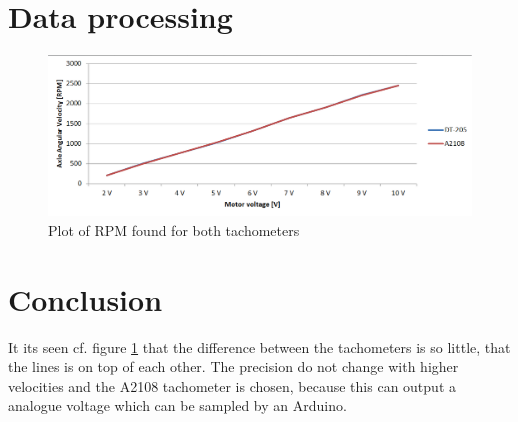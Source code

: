 \section*{Data processing}

\begin{figure}[htbp]
	\centering
	\includegraphics[width=\textwidth]{figures/appendix/Motor&GearTests/RPMTest}
	\caption{Plot of RPM found for both tachometers}\label{fig:RPMTest}
\end{figure}

\section*{Conclusion}
It its seen cf. figure \ref{fig:RPMTest} that the difference between the tachometers is so little, that the lines is on top of each other. The precision do not change with higher velocities and the A2108 tachometer is chosen, because this can output a analogue voltage which can be sampled by an Arduino.

